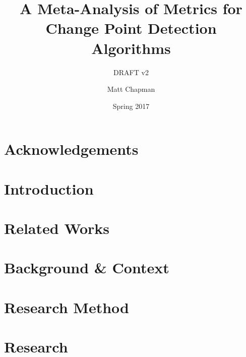 \documentclass{uvamscse}	%
\title{A Meta-Analysis of Metrics for Change Point Detection Algorithms}
\subtitle{DRAFT v2}
\date{Spring 2017}
\author{Matt Chapman}
\begin{document}
\maketitle


\chapter*{Acknowledgements}




\chapter{Introduction}




\chapter{Related Works}




\chapter{Background \& Context}
\label{background}




\chapter{Research Method}
\label{Research Method}




\chapter{Research}
\end{document}
